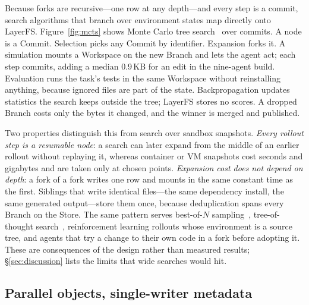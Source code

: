 \documentclass[letterpaper,twocolumn,10pt]{article}
\newcommand{\sys}{LayerFS}
\newcommand{\ws}{Workspace}
\begin{document}
Because forks are recursive---one row at any depth---and every step is a
commit,
search algorithms that branch over environment states map directly onto
\sys{}. Figure~\ref{fig:mcts} shows Monte Carlo tree
search~\cite{uct,mctssurvey} over commits. A node is a Commit. Selection
picks any Commit by identifier. Expansion forks it. A simulation mounts a
\ws{} on the new Branch and lets the agent act; each step commits, adding a
median 0.9\,KB for an edit in the nine-agent build. Evaluation runs the
task's tests in the same \ws{} without reinstalling anything, because
ignored files are part of the state. Backpropagation updates statistics
the search keeps outside the tree; \sys{} stores no scores. A dropped
Branch costs only the bytes it changed, and the winner is merged and
published.

Two properties distinguish this from search over sandbox snapshots.
\emph{Every rollout step is a resumable node}: a search can later expand
from the middle of an earlier rollout without replaying it, whereas
container or VM snapshots cost seconds and gigabytes and are taken only at
chosen points. \emph{Expansion cost does not depend on depth}: a fork of a
fork writes one row and mounts in the same constant time as the first.
Siblings that write identical files---the same dependency install, the same
generated output---store them once, because deduplication spans every
Branch on the Store. The same pattern serves best-of-$N$
sampling~\cite{monkeys}, tree-of-thought search~\cite{tot}, reinforcement
learning rollouts whose environment is a source tree, and agents that try a
change to their own code in a fork before adopting it. These are
consequences of the design rather than measured results;
\S\ref{sec:discussion} lists the limits that wide searches would hit.

\subsection{Parallel objects, single-writer metadata}
\label{sec:store}
\end{document}
